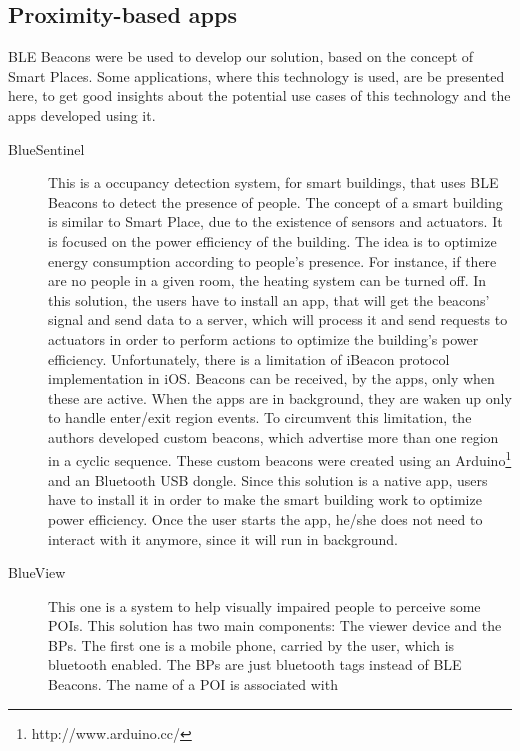 \subsection{Proximity-based apps}
\label{sub:background_ble_beacons_applications}
\gls{BLE} Beacons were
be used to develop our solution, based on the concept of Smart Places.
Some
applications, where this technology is used,
are be presented here, to
get good insights about the potential use cases of this
technology and the apps developed using it.
\begin{description}
  \item[BlueSentinel\cite{Conte2014}]
  This is a
  occupancy detection system, for smart buildings,
  that uses \gls{BLE} Beacons to detect the presence of
  people. The concept of a smart building
  is similar to Smart Place,
  due to the existence of sensors and actuators.
  It is focused on the power efficiency of the
  building. The idea is to optimize energy
  consumption according to people's presence.
  For instance, if there are no people in a given room,
  the heating system can be turned off.
  In this solution, the users have to install
  an app, that will get the beacons' signal and
  send data to a server, which will process it
  and send requests to actuators in order to
  perform actions to optimize the
  building's power efficiency.
  Unfortunately, there is a limitation
  of iBeacon protocol implementation
  in iOS.
  Beacons can be received, by the apps,
  only when these are active. When the apps are in
  background, they are waken up only to handle
  enter/exit region events. To circumvent this
  limitation, the authors developed custom
  beacons, which advertise more than one region
  in a cyclic sequence. These custom beacons
  were created using an
  Arduino\footnote{http://www.arduino.cc/}
  and an Bluetooth \gls{USB} dongle.
  Since this solution is a native app,
  users have to install it in order
  to make the smart building work to
  optimize power efficiency.
  Once the user starts the app, he/she does not
  need to interact with it anymore, since it
  will run in background.
  \item[BlueView\cite{Chen2013}]
  This one is a system to help
  visually impaired people to perceive some \glspl{POI}.
  This solution has two main components: The viewer device
  and the \glspl{BP}. The first one is a mobile phone,
  carried by the user, which is bluetooth enabled.
  The \glspl{BP} are just bluetooth tags instead of
  \gls{BLE} Beacons. The name of a \gls{POI} is associated with

\end{description}

